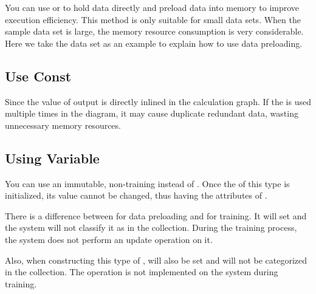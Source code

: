 \begin{content}

You can use  or  to hold data directly and preload data into memory to improve execution efficiency. This method is only suitable for small data sets. When the sample data set is large, the memory resource consumption is very considerable. Here we take the  data set as an example to explain how to use data preloading.


\subsection{Use Const}

Since the value of  output  is directly inlined in the calculation graph. If the  is used multiple times in the diagram, it may cause duplicate redundant data, wasting unnecessary memory resources.


\subsection{Using Variable}

You can use an immutable, non-training  instead of . Once the  of this type is initialized, its value cannot be changed, thus having the attributes of .

There is a difference between  for data preloading and  for training. It will set  and the system will not classify it as  in the collection. During the training process, the system does not perform an update operation on it.

Also, when constructing this type of ,  will also be set and will not be categorized in the  collection. The  operation is not implemented on the system during training.


\end{content}
